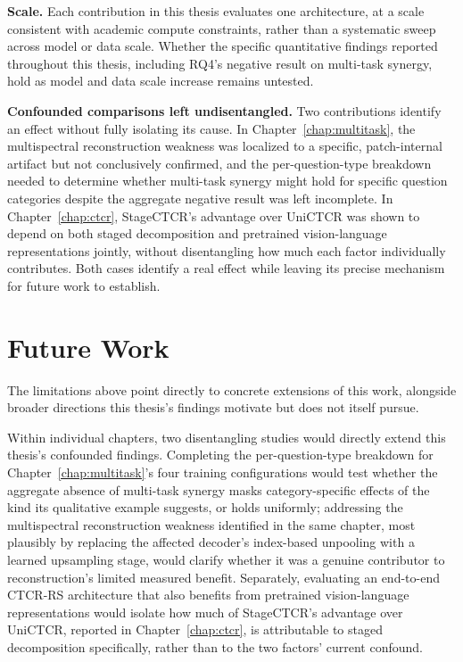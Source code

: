 \textbf{Scale.} Each contribution in this thesis evaluates one architecture, at a scale consistent with academic compute constraints, rather than a systematic sweep across model or data scale. Whether the specific quantitative findings reported throughout this thesis, including RQ4's negative result on multi-task synergy, hold as model and data scale increase remains untested.

\textbf{Confounded comparisons left undisentangled.} Two contributions identify an effect without fully isolating its cause. In Chapter~\ref{chap:multitask}, the multispectral reconstruction weakness was localized to a specific, patch-internal artifact but not conclusively confirmed, and the per-question-type breakdown needed to determine whether multi-task synergy might hold for specific question categories despite the aggregate negative result was left incomplete. In Chapter~\ref{chap:ctcr}, StageCTCR's advantage over UniCTCR was shown to depend on both staged decomposition and pretrained vision-language representations jointly, without disentangling how much each factor individually contributes. Both cases identify a real effect while leaving its precise mechanism for future work to establish.

\section{Future Work}
\label{sec:conclusion_future}

The limitations above point directly to concrete extensions of this work, alongside broader directions this thesis's findings motivate but does not itself pursue.

Within individual chapters, two disentangling studies would directly extend this thesis's confounded findings. Completing the per-question-type breakdown for Chapter~\ref{chap:multitask}'s four training configurations would test whether the aggregate absence of multi-task synergy masks category-specific effects of the kind its qualitative example suggests, or holds uniformly; addressing the multispectral reconstruction weakness identified in the same chapter, most plausibly by replacing the affected decoder's index-based unpooling with a learned upsampling stage, would clarify whether it was a genuine contributor to reconstruction's limited measured benefit. Separately, evaluating an end-to-end CTCR-RS architecture that also benefits from pretrained vision-language representations would isolate how much of StageCTCR's advantage over UniCTCR, reported in Chapter~\ref{chap:ctcr}, is attributable to staged decomposition specifically, rather than to the two factors' current confound.


